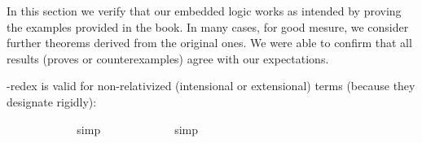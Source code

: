 %
\begin{isabellebody}%
%
%
\isadelimtheory
%
\endisadelimtheory
%
\isatagtheory
%
\endisatagtheory
{\isafoldtheory}%
%
\isadelimtheory
%
\endisadelimtheory
%
\isamarkuptrue%
%
\begin{isamarkuptext}%
In this section we verify that our embedded logic works as intended by proving the examples provided in the book.
 In many cases, for good mesure, we consider further theorems derived from the original ones. We were able to confirm that all results
 (proves or counterexamples) agree with our expectations.%
\end{isamarkuptext}\isamarkuptrue%
%
\isamarkuptrue%
%
\isamarkuptrue%
%
\begin{isamarkuptext}%
\isa{{\isasymbeta}{\isasymeta}}-redex is valid for non-relativized (intensional or extensional) terms (because they designate rigidly):%
\end{isamarkuptext}\isamarkuptrue%
\isamarkupfalse%
\ {\isachardoublequoteopen}{\isasymlfloor}{\isacharparenleft}{\isacharparenleft}{\isasymlambda}{\isasymalpha}{\isachardot}\ {\isasymphi}\ {\isasymalpha}{\isacharparenright}\ \ {\isacharparenleft}{\isasymtau}{\isacharcolon}{\isacharcolon}{\isasymup}{\isasymzero}{\isacharparenright}{\isacharparenright}\ \isactrlbold {\isasymleftrightarrow}\ {\isacharparenleft}{\isasymphi}\ \ {\isasymtau}{\isacharparenright}{\isasymrfloor}{\isachardoublequoteclose}%
\isadelimproof
\ %
\endisadelimproof
%
\isatagproof
{}\isamarkupfalse%
\ simp%
\endisatagproof
{\isafoldproof}%
%
\isadelimproof
%
\endisadelimproof
\isanewline
{}\isamarkupfalse%
\ {\isachardoublequoteopen}{\isasymlfloor}{\isacharparenleft}{\isacharparenleft}{\isasymlambda}{\isasymalpha}{\isachardot}\ {\isasymphi}\ {\isasymalpha}{\isacharparenright}\ \ {\isacharparenleft}{\isasymtau}{\isacharcolon}{\isacharcolon}{\isasymzero}{\isacharparenright}{\isacharparenright}\ \isactrlbold {\isasymleftrightarrow}\ {\isacharparenleft}{\isasymphi}\ \ {\isasymtau}{\isacharparenright}{\isasymrfloor}{\isachardoublequoteclose}%
\isadelimproof
\ %
\endisadelimproof
%
\isatagproof
{}\isamarkupfalse%
\ simp%
\endisatagproof
{\isafoldproof}%
%
\isadelimproof
%
\endisadelimproof
\isanewline
{}\isamarkupfalse%
\ {\isachardoublequoteopen}{\isasymlfloor}{\isacharparenleft}{\isacharparenleft}{\isasymlambda}{\isasymalpha}{\isachardot}\ \isactrlbold {\isasymbox}{\isasymphi}\ {\isasymalpha}{\isacharparenright}\ {\isacharparenleft}{\isasymtau}{\isacharcolon}{\isacharcolon}{\isasymup}{\isasymzero}{\isacharparenright}{\isacharparenright}\ \isactrlbold {\isasymleftrightarrow}\ {\isacharparenleft}\isactrlbold {\isasymbox}{\isasymphi}\ {\isasymtau}{\isacharparenright}{\isasymrfloor}{\isachardoublequoteclose}%

\end{isabellebody}
